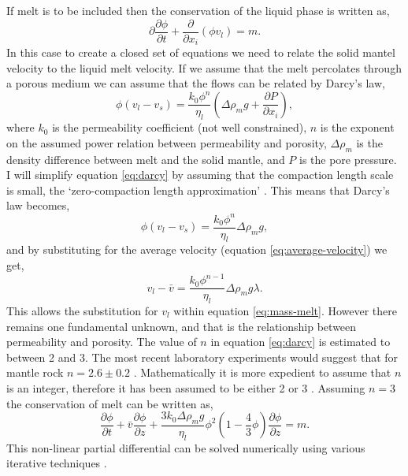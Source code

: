 If melt is to be included then the conservation of the liquid phase is written as,
\begin{equation}
\partial
\frac{\partial \phi}{\partial t} + \frac{\partial}{\partial x_{i}}\left( \phi v_{l} \right) = m.
\label{eq:mass-melt}
\end{equation}
In this case to create a closed set of equations we need to relate the solid mantel velocity to the liquid melt velocity. If we assume that the melt percolates through a porous medium we can assume that the flows can be related by Darcy's law,
\begin{equation}
\phi\left( v_{l}-v_{s} \right) = \frac{k_{0}\phi^{n}}{\eta_{l}}\left( \Delta\rho_{m}g + \frac{\partial P}{\partial x_{i}} \right),
\label{eq:darcy}
\end{equation}
where $k_{0}$ is the permeability coefficient (not well constrained), $n$ is the exponent on the assumed power relation between permeability and porosity, $\Delta\rho_{m}$ is the density difference between melt and the solid mantle, and $P$ is the pore pressure. I will simplify equation \ref{eq:darcy} by assuming that the compaction length scale is small, the `zero-compaction length approximation' \citep{ribe-1985}. This means that Darcy's law becomes,
\begin{equation}
\phi\left( v_{l}-v_{s} \right) = \frac{k_{0}\phi^{n}}{\eta_{l}}\Delta\rho_{m}g,
\end{equation}
and by substituting for the average velocity (equation \ref{eq:average-velocity}) we get,
\begin{equation}
v_{l}-\bar{v} = \frac{k_{0}\phi^{n-1}}{\eta_{l}}\Delta\rho_{m}g\lambda.
\end{equation}
This allows the substitution for $v_{l}$ within equation \ref{eq:mass-melt}. However there remains one fundamental unknown, and that is the relationship between permeability and porosity. The value of $n$ in equation \ref{eq:darcy} is estimated to between 2 and 3. The most recent laboratory experiments would suggest that for mantle rock $n = 2.6\pm0.2$ \citep{miller-etal-2014}. Mathematically it is more expedient to assume that $n$ is an integer, therefore it has been assumed to be either 2 \citep[e.g.][]{scott-1989,goes-etal-2012} or 3 \citep[e.g.][]{hewitt-2010,armitage-etal-grl-2019}. Assuming $n=3$ the conservation of melt can be written as,
\begin{equation}
\frac{\partial \phi}{\partial t} + \bar{v}\frac{\partial \phi}{\partial z} + \frac{3k_{0}\Delta\rho_{m}g}{\eta_{l}}\phi^{2}\left( 1-\frac{4}{3}\phi \right)\frac{\partial \phi}{\partial z} = m.
\end{equation}
This non-linear partial differential can be solved numerically using various iterative techniques \citep[e.g.][]{armitage-etal-grl-2019,franken-etal-2020}.

